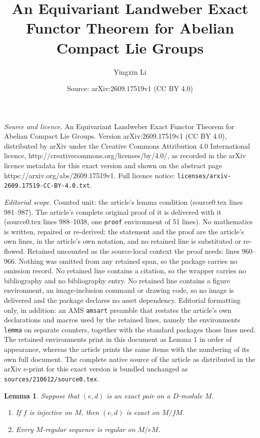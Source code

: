 \documentclass[10pt,a4paper]{amsart}
\title{An Equivariant Landweber Exact Functor Theorem for Abelian Compact Lie Groups}
\author{Yingxin Li}
\date{Source: arXiv:2609.17519v1 (CC BY 4.0)}
\newtheorem{lemma}{Lemma}
\begin{document}
\maketitle

\noindent\emph{Source and licence.} An Equivariant Landweber Exact Functor Theorem for Abelian Compact Lie Groups. Version arXiv:2609.17519v1 (CC BY 4.0), distributed by arXiv under the Creative Commons Attribution 4.0 International licence, http://creativecommons.org/licenses/by/4.0/, as recorded in the arXiv licence metadata for this exact version and shown on the abstract page https://arxiv.org/abs/2609.17519v1. Full licence notice: \texttt{licenses/arxiv-2609.17519-CC-BY-4.0.txt}.\par\smallskip

\noindent\textit{Editorial scope.} Counted unit: the article's lemma condition (source0.tex lines 981--987). The article's complete original proof of it is delivered with it (source0.tex lines 988--1038, one \texttt{proof} environment of 51 lines). No mathematics is written, repaired or re-derived: the statement and the proof are the article's own lines, in the article's own notation, and no retained line is substituted or re-flowed.  Retained uncounted as the source-local context the proof needs: lines 960--966.  Nothing was omitted from any retained span, so the package carries no omission record.  No retained line contains a citation, so the wrapper carries no bibliography and no bibliography entry.  No retained line contains a figure environment, an image-inclusion command or drawing code, so no image is delivered and the package declares no asset dependency.  Editorial formatting only, in addition: an AMS \texttt{amsart} preamble that restates the article's own declarations and macros used by the retained lines, namely the environments \texttt{lemma} on separate counters, together with the standard packages those lines need.  The retained environments print in this document as Lemma 1 in order of appearance, whereas the article prints the same items with the numbering of its own full document.  The complete native source of the article as distributed in the arXiv e-print for this exact version is bundled unchanged as \texttt{sources/210612/source0.tex}.
\begin{lemma}\label{lem:compact-exact-regular}
Suppose that $(e,d)$ is an exact pair on a $D$-module $M$.
\begin{enumerate}[label=\textup{(\roman*)},leftmargin=3em]
\item If $f$ is injective on $M$, then $(e,d)$ is exact on $M/fM$.
\item Every $M$-regular sequence is regular on $M/eM$.
\end{enumerate}
\end{lemma}
\end{document}
